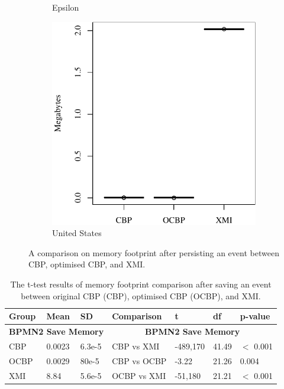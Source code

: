 \documentclass{llncs}
\begin{document}
{\begin{figure}
\begin{subfigure}{0.325\textwidth}
            \caption{Epsilon}
            \label{fig:save_memory_epsilon}
        \end{subfigure}
        \hfill
        \begin{subfigure}{0.325\textwidth}
            \centering
            \includegraphics[width=\linewidth]{images/save_memory_wikipedia}
            \caption{United States}
            \label{fig:save_memory_wikipedia}
        \end{subfigure}
        \caption{A comparison on memory footprint after persisting an event between CBP, optimised CBP, and XMI.}
        \label{fig:savememory}
    \end{figure}

   \begin{table}[t]
       \footnotesize
       \centering
       \caption{The t-test results of memory footprint comparison after saving an event between original CBP (CBP), optimised CBP (OCBP), and XMI.}
       \label{table:ttest_results_save_memory}
       \begin{tabular}
           {|p{}p{}p{}|p{}p{}p{}p{}|}
           \hline 
           
           Group & Mean & SD & Comparison & t  & df & p-value \\
           \hline 
           \multicolumn{3}{|c|}{\textbf{BPMN2 Save Memory}} & \multicolumn{4}{c|}{\textbf{BPMN2 Save Memory}} \\
           CBP &0.0023    & 6.3e-5 & CBP vs XMI &  -489,170    & 41.49 & $<$ 0.001 \\  
           OCBP &0.0029    & 80e-5 & CBP vs OCBP & -3.22 & 21.26 & 0.004 \\  
           XMI & 8.84   & 5.6e-5 & OCBP vs XMI & -51,180    &  21.21  & $<$ 0.001 \\ 
           \hline 
           

\end{tabular}
\end{table}}
\end{document}
